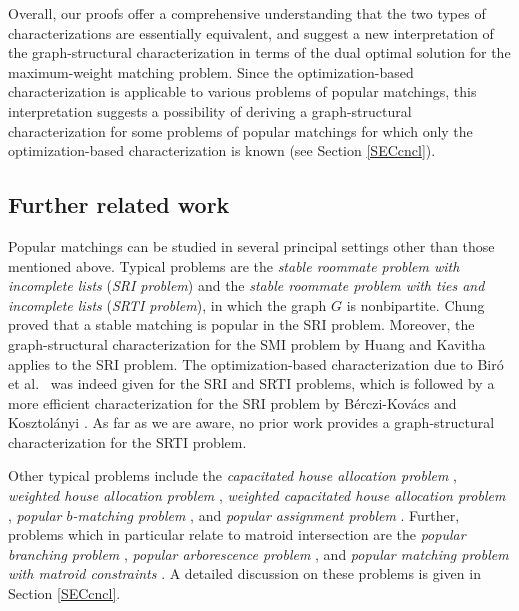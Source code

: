 \documentclass[11pt,a4paper,showkeys]{article}
\theoremstyle{plain}
\theoremstyle{definition}
\begin{document}
\bigskip


Overall, 
our proofs 
offer a comprehensive understanding that the two types of characterizations are 
essentially equivalent, 
and 
suggest a new interpretation of the graph-structural characterization 
in terms of the dual optimal solution for the maximum-weight matching problem. 
Since the optimization-based characterization is applicable to various problems of popular matchings, 
this interpretation suggests a possibility of deriving a graph-structural characterization 
for some problems of popular matchings for which only the optimization-based characterization is known (see Section \ref{SECcncl}). 

\subsection{Further related work}

Popular matchings can be studied in several principal settings other than those mentioned above. 
Typical problems are the \emph{stable roommate problem with incomplete lists} (\emph{SRI problem}) 
and the \emph{stable roommate problem with ties and incomplete lists} (\emph{SRTI problem}),  
in which the graph $G$ is nonbipartite. 
Chung \cite{Chu00} proved that a stable matching is popular in the SRI problem. 
Moreover, 
the graph-structural characterization for the SMI problem by Huang and Kavitha \cite{HK13} applies to the SRI problem. 
The optimization-based characterization due to Bir\'o et al.\ \cite{BIM10} was indeed given for the SRI and SRTI problems, 
which is followed by a more efficient characterization for the SRI problem by B\'{e}rczi-Kov\'{a}cs and Kosztol\'{a}nyi \cite{BKK25}. 
As far as we are aware, no prior work provides a graph-structural characterization for the SRTI problem. 

Other typical problems include the \emph{capacitated house allocation problem} \cite{MS06}, 
\emph{weighted house allocation problem} \cite{Mes14}, 
\emph{weighted capacitated house allocation problem} \cite{SM10}, 
\emph{popular $b$-matching problem} \cite{Csa24,Pal14}, 
and \emph{popular assignment problem} \cite{KKMSS22soda}. 
Further, 
problems which in particular relate to matroid intersection are 
the \emph{popular branching problem} \cite{KKMSS22,NT23}, 
\emph{popular arborescence problem} \cite{KMSY25}, 
and \emph{popular matching problem with matroid constraints} \cite{CKTY25+,Kam16,Kam17,Kam20}. 
A detailed discussion on these problems is given in Section \ref{SECcncl}.
\end{document}
